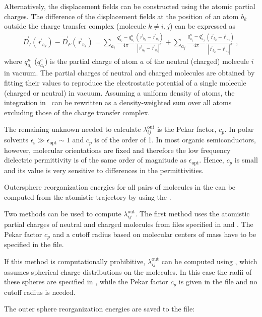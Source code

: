 Alternatively, the displacement fields can be constructed using the atomic partial charges. The difference of the displacement fields at the position of an atom $b_k$ outside the charge transfer complex (molecule $k \ne i,j$)  can be expressed as
\begin{eqnarray}
\label{equ:disp_atom}
\vec{D}_I(\vec{r}_{b_k}) - \vec{D}_F(\vec{r}_{b_k})  = 
\sum_{a_i} \frac{q_{a_i}^c - q_{a_i}^n}{4\pi } \frac{ (\vec{r}_{b_k} - \vec{r}_{a_i} ) }
                                            {|\vec{r}_{b_k}-\vec{r}_{a_i}|^3}+
\sum_{a_j} \frac{q_{a_j}^n - q_{a_j}^c}{4\pi } \frac{ (\vec{r}_{b_k}-\vec{r}_{a_j} ) } 
                                            {|\vec{r}_{b_k}-\vec{r}_{a_j}|^3}\,,
\end{eqnarray}
where $q^n_{a_i}$ ($q^c_{a_i}$) is the partial charge of atom $a$ of the neutral (charged) molecule $i$ in vacuum. The partial charges of neutral and charged molecules are obtained by fitting their values to reproduce the electrostatic potential of a single molecule (charged or neutral) in vacuum. 
%
Assuming a uniform density of atoms, the integration in~ can be rewritten as a density-weighted sum over all atoms excluding those of the charge transfer complex.

The remaining unknown needed to calculate $\lambda_{ij}^\text{out}$ is the Pekar factor, $c_p$. In polar solvents $\epsilon_\text{s}\gg\epsilon_\text{opt}\sim 1$ and $c_p$ is of the order of 1. In most organic semiconductors, however, molecular orientations are fixed and therefore the low frequency dielectric permittivity is of the same order of magnitude as $\epsilon_\text{opt}$. Hence, $c_p$ is small and its value is very sensitive to differences in the permittivities. 


Outersphere reorganization energies for all pairs of molecules in the  can be computed from the atomistic trajectory by using the  \calculator. 

Two methods can be used to compute $\lambda_{ij}^\text{out}$. The first method uses the atomistic partial charges of neutral and charged molecules from files specified in \xmlsegments and . The Pekar factor $c_p$ and a cutoff radius  based on molecular centers of mass have to be specified in the \xmloptions file. 

If this method is computationally prohibitive, $\lambda_{ij}^\text{out}$ can be computed using , which assumes spherical charge distributions on the molecules. In this case the radii of these spheres are specified in \xmlsegments, while the Pekar factor $c_p$ is given in the \xmloptions file and no cutoff radius is needed. 

The outer sphere reorganization energies are saved to the \sqlstate file:

{\small \ctprun \opt \xmloptions  \seg  \xmlsegments \sql  \sqlstate \exe  {}}
